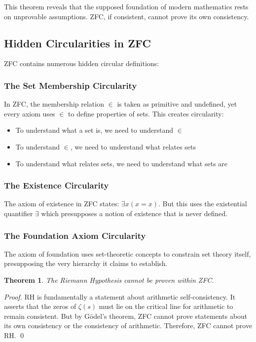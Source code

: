\documentclass[12pt]{article}
\newtheorem{theorem}{Theorem}[section]
\begin{document}
This theorem reveals that the supposed foundation of modern mathematics rests on unprovable assumptions. ZFC, if consistent, cannot prove its own consistency.

\subsection{Hidden Circularities in ZFC}

ZFC contains numerous hidden circular definitions:

\subsubsection{The Set Membership Circularity}
In ZFC, the membership relation $\in$ is taken as primitive and undefined, yet every axiom uses $\in$ to define properties of sets. This creates circularity:
\begin{itemize}
\item To understand what a set is, we need to understand $\in$
\item To understand $\in$, we need to understand what relates sets
\item To understand what relates sets, we need to understand what sets are
\end{itemize}

\subsubsection{The Existence Circularity}
The axiom of existence in ZFC states: $\exists x (x = x)$. But this uses the existential quantifier $\exists$ which presupposes a notion of existence that is never defined.

\subsubsection{The Foundation Axiom Circularity}
The axiom of foundation uses set-theoretic concepts to constrain set theory itself, presupposing the very hierarchy it claims to establish.

\begin{theorem}
The Riemann Hypothesis cannot be proven within ZFC.
\end{theorem}

\begin{proof}
RH is fundamentally a statement about arithmetic self-consistency. It asserts that the zeros of $\zeta(s)$ must lie on the critical line for arithmetic to remain consistent. But by Gödel's theorem, ZFC cannot prove statements about its own consistency or the consistency of arithmetic. Therefore, ZFC cannot prove RH. \qed
\end{proof}
\end{document}
